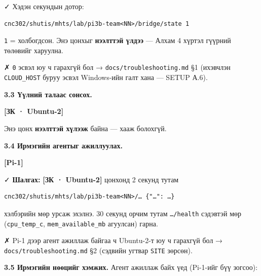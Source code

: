 ✓ Хэдэн секундын дотор:

\begin{verbatim}
cnc302/shutis/mhts/lab/pi3b-team<NN>/bridge/state 1
\end{verbatim}

\texttt{1} = холбогдсон. Энэ цонхыг \textbf{нээлттэй үлдээ} --- Алхам 4 хүртэл гүүрний төлөвийг харуулна.

✗ \texttt{0} эсвэл юу ч гарахгүй бол → \texttt{docs/\allowbreak{}troubleshooting.\allowbreak{}md} §1 (ихэвчлэн \texttt{CLOUD\_HOST} буруу эсвэл Windows-ийн галт хана --- SETUP А.6).

\textbf{3.3 Үүлний талаас сонсох.}

\textbf{{[}ЗК · Ubuntu-2{]}}

\begin{Shaded}
\begin{Highlighting}[]
\end{Highlighting}
\end{Shaded}

Энэ цонх \textbf{нээлттэй хүлээж} байна --- хааж болохгүй.

\textbf{3.4 Ирмэгийн агентыг ажиллуулах.}

\textbf{{[}Pi-1{]}}

\begin{Shaded}
\begin{Highlighting}[]
\KeywordTok{\&\&} 
\end{Highlighting}
\end{Shaded}

✓ \textbf{Шалгах:} \textbf{{[}ЗК · Ubuntu-2{]}} цонхонд 2 секунд тутам

\begin{verbatim}
cnc302/shutis/mhts/lab/pi3b-team<NN>/… {"…": …}
\end{verbatim}

хэлбэрийн мөр урсаж эхэлнэ. 30 секунд орчим тутам \texttt{\ldots{}/health} сэдэвтэй мөр (\texttt{cpu\_\allowbreak{}temp\_\allowbreak{}c}, \texttt{mem\_\allowbreak{}available\_\allowbreak{}mb} агуулсан) гарна.

✗ Pi-1 дээр агент ажиллаж байгаа ч Ubuntu-2-т юу ч гарахгүй бол → \texttt{docs/\allowbreak{}troubleshooting.\allowbreak{}md} §2 (сэдвийн угтвар \texttt{SITE} зөрсөн).

\textbf{3.5 Ирмэгийн нөөцийг хэмжих.} Агент ажиллаж байх үед (Pi-1-ийг бүү зогсоо):

